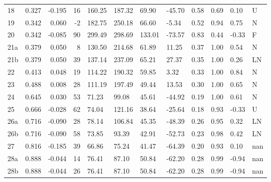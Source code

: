 \begin{tabular}{lrrrllllllll}
   18 &  0.327 & -0.195 &   16 &      160.25 &      187.32 &        69.90 &        -45.70 &           0.58 &         0.69 &    0.10 &           U \\
   19 &  0.342 &  0.060 &   -2 &      182.75 &      250.18 &        66.60 &         -5.34 &           0.52 &         0.94 &    0.75 &           N \\
   20 &  0.342 & -0.085 &   90 &      299.49 &      298.69 &       133.01 &        -73.57 &           0.83 &         0.44 &   -0.33 &           F \\
  21a &  0.379 &  0.050 &    8 &      130.50 &      214.68 &        61.89 &         11.25 &           0.37 &         1.00 &    0.54 &           N \\
  21b &  0.379 &  0.050 &   39 &      137.14 &      237.09 &        65.21 &         27.37 &           0.35 &         1.00 &    0.26 &          LN \\
   22 &  0.413 &  0.048 &   19 &      114.22 &      190.32 &        59.85 &          3.32 &           0.33 &         1.00 &    0.84 &           N \\
   23 &  0.488 &  0.008 &   28 &      111.19 &      197.49 &        49.44 &         13.53 &           0.30 &         1.00 &    0.65 &           N \\
   24 &  0.645 &  0.030 &   53 &       71.23 &       99.08 &        45.61 &        -44.92 &           0.19 &         1.00 &    0.61 &           N \\
   25 &  0.666 & -0.028 &   62 &       74.04 &      121.16 &        38.64 &        -25.64 &           0.18 &         0.93 &   -0.33 &           U \\
  26a &  0.716 & -0.090 &   28 &       78.14 &      106.84 &        45.35 &        -48.39 &           0.26 &         0.95 &    0.32 &          LN \\
  26b &  0.716 & -0.090 &   58 &       73.85 &       93.39 &        42.91 &        -52.73 &           0.23 &         0.98 &    0.42 &          LN \\
   27 &  0.816 & -0.185 &   39 &       66.86 &       75.24 &        41.47 &        -64.39 &           0.20 &         0.93 &    0.10 &         nan \\
  28a &  0.888 & -0.044 &   14 &       76.41 &       87.10 &        50.84 &        -62.20 &           0.28 &         0.99 &   -0.94 &         nan \\
  28b &  0.888 & -0.044 &   26 &       76.41 &       87.10 &        50.84 &        -62.20 &           0.28 &         0.99 &   -0.94 &         nan \\

\end{tabular}
